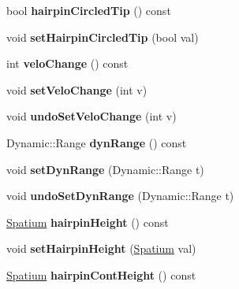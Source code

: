 \begin{DoxyCompactItemize}
\mbox{\label{class_ms_1_1_hairpin_a19486ad49c1faa53371047a01adb2292}} 
bool {\bfseries hairpin\+Circled\+Tip} () const
\item 
\mbox{\label{class_ms_1_1_hairpin_a6003212d67466dc531dd3c47fa0b2ecb}} 
void {\bfseries set\+Hairpin\+Circled\+Tip} (bool val)
\item 
\mbox{\label{class_ms_1_1_hairpin_a0f4494b8758985eb2f1a8819eb94a8c4}} 
int {\bfseries velo\+Change} () const
\item 
\mbox{\label{class_ms_1_1_hairpin_ad77ceb1b4bd87bee92d2e77b845c0989}} 
void {\bfseries set\+Velo\+Change} (int v)
\item 
\mbox{\label{class_ms_1_1_hairpin_a47f7ea44f824d788258f54e1e013710d}} 
void {\bfseries undo\+Set\+Velo\+Change} (int v)
\item 
\mbox{\label{class_ms_1_1_hairpin_adcf1af50b043b7ab8e47d518fe023ba2}} 
Dynamic\+::\+Range {\bfseries dyn\+Range} () const
\item 
\mbox{\label{class_ms_1_1_hairpin_aa7b15efdb924bd39eefa501fa6832b6b}} 
void {\bfseries set\+Dyn\+Range} (Dynamic\+::\+Range t)
\item 
\mbox{\label{class_ms_1_1_hairpin_a5440d29c097ac9923b8a0e42dd669627}} 
void {\bfseries undo\+Set\+Dyn\+Range} (Dynamic\+::\+Range t)
\item 
\mbox{\label{class_ms_1_1_hairpin_a438ab105d43c7a73901f6cbd650e8b3d}} 
\hyperlink{class_ms_1_1_spatium}{Spatium} {\bfseries hairpin\+Height} () const
\item 
\mbox{\label{class_ms_1_1_hairpin_ab80bda994499612a2bf068e9f78f1b09}} 
void {\bfseries set\+Hairpin\+Height} (\hyperlink{class_ms_1_1_spatium}{Spatium} val)
\item 
\mbox{\label{class_ms_1_1_hairpin_ad3b031a6ee0e77d3041cc024fa234f7b}} 
\hyperlink{class_ms_1_1_spatium}{Spatium} {\bfseries hairpin\+Cont\+Height} () const

\end{DoxyCompactItemize}
